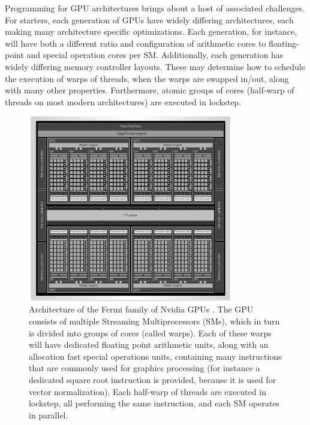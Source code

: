 Programming for GPU architectures brings about a host of associated challenges. For starters, each generation of GPUs have widely differing architectures, each making many architecture specific optimizations. Each generation, for instance, 
will have both a different ratio and configuration of arithmetic cores to floating-point and special operation cores per SM. Additionally, each generation has widely differing memory controller layouts. These may determine how to schedule 
the execution of warps of threads, when the warps are swapped in/out, along with many other properties. Furthermore, atomic groups of cores (half-warp of threads on most modern
architectures) are executed in lockstep. 
\begin{figure}[h!]
\begin{mdframed}
 \centering
 \includegraphics[width=0.8\textwidth]{fermi_arch.png}
 \caption[Architecture of the Fermi family of Nvidia GPUs]{Architecture of the Fermi family of Nvidia GPUs \cite{wittenbrink2011fermi}. The GPU consists of multiple Streaming Multiprocessors (SMs), which in turn is divided into groups
 of cores (called warps). Each of these warps will have dedicated floating point arithmetic units, along with an allocation fast special operations units, containing many instructions that
 are commonly used for graphics processing (for instance a dedicated square root instruction is provided, because it is used for vector normalization). Each half-warp of threads
 are executed in lockstep, all performing the same instruction, and each SM operates in parallel.}
 \label{FERMI_ARCH}
\end{mdframed}
\end{figure}

